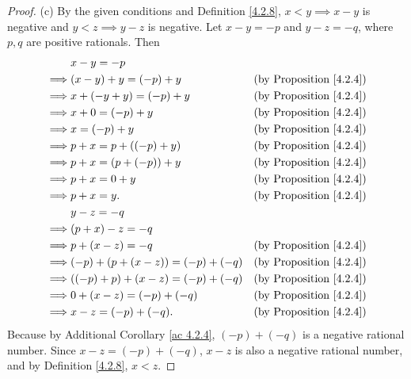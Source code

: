 \begin{proof}{(c)}
By the given conditions and Definition \ref{4.2.8}, \(x < y \implies x - y\) is negative and \(y < z \implies y - z\) is negative.
Let \(x - y = -p\) and \(y - z = -q\), where \(p, q\) are positive rationals.
Then
\begin{align*}
& x - y = -p \\
\implies & (x - y) + y = (-p) + y & \text{(by Proposition \ref{4.2.4})} \\
\implies & x + (-y + y) = (-p) + y & \text{(by Proposition \ref{4.2.4})} \\
\implies & x + 0 = (-p) + y & \text{(by Proposition \ref{4.2.4})} \\
\implies & x = (-p) + y & \text{(by Proposition \ref{4.2.4})} \\
\implies & p + x = p + ((-p) + y) & \text{(by Proposition \ref{4.2.4})} \\
\implies & p + x = (p + (-p)) + y & \text{(by Proposition \ref{4.2.4})} \\
\implies & p + x = 0 + y & \text{(by Proposition \ref{4.2.4})} \\
\implies & p + x = y. & \text{(by Proposition \ref{4.2.4})} \\
& y - z = -q \\
\implies & (p + x) - z = -q \\
\implies & p + (x - z) = -q & \text{(by Proposition \ref{4.2.4})} \\
\implies & (-p) + (p + (x - z)) = (-p) + (-q) & \text{(by Proposition \ref{4.2.4})} \\
\implies & ((-p) + p) + (x - z) = (-p) + (-q) & \text{(by Proposition \ref{4.2.4})} \\
\implies & 0 + (x - z) = (-p) + (-q) & \text{(by Proposition \ref{4.2.4})} \\
\implies & x - z = (-p) + (-q). & \text{(by Proposition \ref{4.2.4})} \\
\end{align*}
Because by Additional Corollary \ref{ac 4.2.4}, \((-p) + (-q)\) is a negative rational number.
Since \(x - z = (-p) + (-q)\), \(x - z\) is also a negative rational number, and by Definition \ref{4.2.8}, \(x < z\).
\end{proof}

